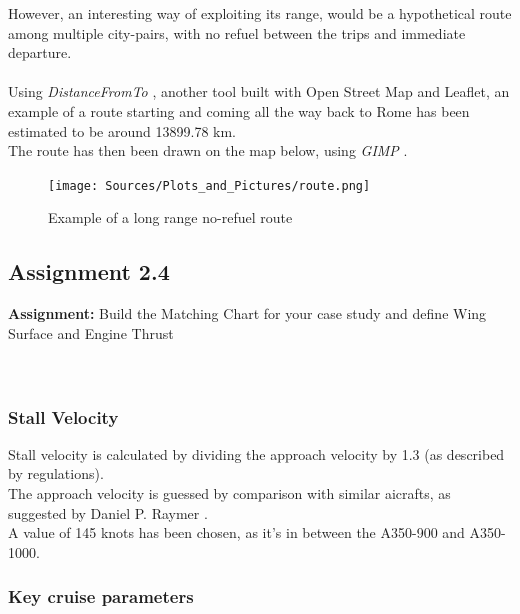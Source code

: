 \documentclass{article}
\begin{document}
\clearpage



However, an interesting way of exploiting its range, would be a hypothetical route among multiple city-pairs, with no
refuel between the trips and immediate departure. \\ \\ 
Using \textit{DistanceFromTo} \autocite{City_Distance_Calculator}, another tool built with Open Street Map and Leaflet, an example of
a route starting and coming all the way back to Rome has been estimated to be around 13899.78 km. \\ 
The route has then been drawn on the map below, using \textit{GIMP} \autocite{GIMP}. \\ 

\begin{figure}[h!]
    \centering
    \texttt{[image: Sources/Plots\_and\_Pictures/route.png]}
    \caption{Example of a long range no-refuel route}
    \label{Global_Coverage}
\end{figure}
\clearpage


\pagebreak 

\subsection{Assignment 2.4\label{Assignment_2.4}}
\textbf{Assignment:} Build the Matching Chart for your case study and define
 Wing Surface and Engine Thrust \\ \\ \\ 

 \subsubsection{Stall Velocity\label{stall_velocity}}

 Stall velocity is calculated by dividing
 the approach velocity by 1.3 (as described by regulations). \\ 
 The approach velocity is guessed by comparison with similar aicrafts, as suggested by Daniel P. Raymer \autocite{Raymer_Daniel}.\\ 
 A value of 145 knots has been chosen, as it's in between the A350-900 and A350-1000.\\ 

 \subsubsection{Key cruise parameters\label{cruise_parameters}}
\end{document}

